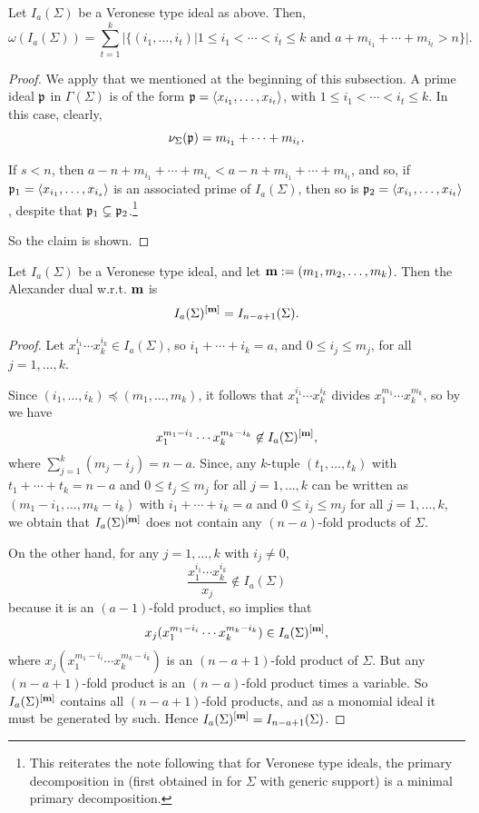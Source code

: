 \documentclass[11pt]{amsart}   %
\begin{document}
\begin{thm}\label{thm_Veronese} Let $I_a(\Sigma)$ be a Veronese type ideal as above. Then, $$\omega(I_a(\Sigma))=\sum_{t=1}^k|\{(i_1,\ldots,i_t)|1\leq i_1<\cdots<i_t\leq k \mbox{ and } a+m_{i_1}+\cdots+m_{i_t}>n\}|.$$
\end{thm}
\begin{proof} We apply \cite[Theorem 2.2]{BuToXi} that we mentioned at the beginning of this subsection. A prime ideal $\frak p$ in $\Gamma(\Sigma)$ is of the form $\frak p=\langle x_{i_1},\ldots,x_{i_t}\rangle$, with $1\leq i_1<\cdots<i_t\leq k$. In this case, clearly, $$\nu_{\Sigma}(\frak p)=m_{i_1}+\cdots+m_{i_t}.$$

If $s<n$, then $a-n+m_{i_1}+\cdots+m_{i_s}<a-n+m_{i_1}+\cdots+m_{i_t}$, and so, if $\frak p_1=\langle x_{i_1},\ldots,x_{i_s}\rangle$ is an associated prime of $I_a(\Sigma)$, then so is $\frak p_2=\langle x_{i_1},\ldots,x_{i_t}\rangle$, despite that $\frak p_1\subsetneq\frak p_2$.\footnote{This reiterates the note following \cite[Corollary 2.4]{ToXi} that for Veronese type ideals, the primary decomposition in \cite[Theorem 2.2]{BuToXi} (first obtained in \cite{ToXi} for $\Sigma$ with generic support) is a minimal primary decomposition.} 

So the claim is shown.
\end{proof}

\begin{lem}\label{lem_Veronese} Let $I_a(\Sigma)$ be a Veronese type ideal, and let ${\bf m}:=(m_1,m_2,\ldots,m_k)$. Then the Alexander dual w.r.t. ${\bf m}$ is $$I_a(\Sigma)^{[{\bf m}]}=I_{n-a+1}(\Sigma).$$
\end{lem}
\begin{proof} Let $x_1^{i_1}\cdots x_k^{i_k}\in I_a(\Sigma)$, so $i_1+\cdots+i_k=a$, and $0\leq i_j\leq m_j$, for all $j=1,\ldots,k$. 

Since $(i_1,\ldots,i_k)\preceq (m_1,\ldots,m_k)$, it follows that $x_1^{i_1}\cdots x_k^{i_k}$ divides $x_1^{m_1}\cdots x_k^{m_k}$, so by \cite[Proposition 5.23]{MiSt} we have
$$x_1^{m_1-i_1}\cdots x_k^{m_k-i_k}\not\in I_a(\Sigma)^{[{\bf m}]},$$
where $\displaystyle \sum_{j=1}^k (m_j-i_j)=n-a$. Since, any $k$-tuple $(t_1,\ldots,t_k)$ with $t_1+\cdots+t_k=n-a$ and $0\leq t_j\leq m_j$ for all $j=1,\ldots,k$ can be written as $(m_1-i_1,\ldots,m_k-i_k)$ with $i_1+\cdots+i_k=a$ and $0\leq i_j\leq m_j$ for all $j=1,\ldots,k$, we obtain that $I_a(\Sigma)^{[{\bf m}]}$ does not contain any $(n-a)$-fold products of $\Sigma$. 

On the other hand, for any $j=1,\ldots,k$ with $i_j\neq 0$,
$$\frac{x_1^{i_1}\cdots x_k^{i_k}}{x_j}\not\in I_a(\Sigma)$$
because it is an $(a-1)$-fold product, so \cite[Proposition 5.23]{MiSt} implies that
\[
    x_j(x_1^{m_1-i_i}\cdots x_k^{m_k-i_k}) \in I_a(\Sigma)^{[{\bf m}]},
\]
where $x_j(x_1^{m_1-i_i}\cdots x_k^{m_k-i_k})$ is an $(n-a+1)$-fold product of $\Sigma$. But any $(n-a+1)$-fold product is an $(n-a)$-fold product times a variable. So $I_a(\Sigma)^{[{\bf m}]}$ contains all $(n-a+1)$-fold products, and as a monomial ideal it must be generated by such. Hence $I_a(\Sigma)^{[{\bf m}]}=I_{n-a+1}(\Sigma)$.
\end{proof}
\end{document}
